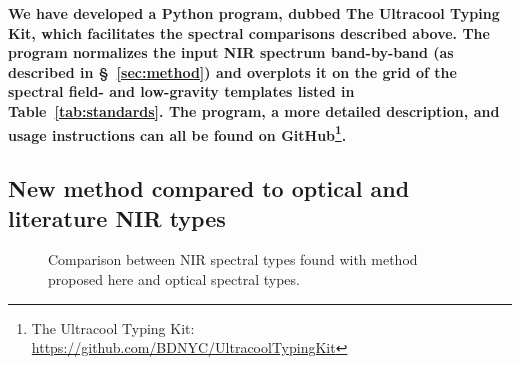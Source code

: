 \documentclass[12pt]{aastex6}
\begin{document}


\textbf{
We have developed a Python program, dubbed The Ultracool Typing Kit, which facilitates the spectral comparisons described above.
The program normalizes the input NIR spectrum band-by-band (as described in \S~\ref{sec:method}) and overplots it on the grid of the spectral field- and low-gravity templates listed in Table~\ref{tab:standards}.
The program, a more detailed description, and usage instructions can all be found on GitHub\footnote{The Ultracool Typing Kit: \url{https://github.com/BDNYC/UltracoolTypingKit}}.}

\subsection{New method compared to optical and literature NIR types}

\begin{figure}
  \caption{Comparison between NIR spectral types found with method proposed here and optical spectral types.}
  \label{fig:optical NIR comparison}
\end{figure}
\end{document}
